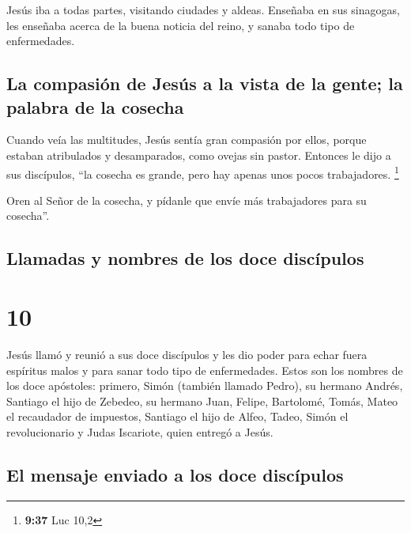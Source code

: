  Jesús iba a todas partes, visitando ciudades y aldeas.
Enseñaba en sus sinagogas, les enseñaba acerca de la buena noticia del
reino, y sanaba todo tipo de enfermedades.

\hypertarget{la-compasiuxf3n-de-jesuxfas-a-la-vista-de-la-gente-la-palabra-de-la-cosecha}{%
\subsection{La compasión de Jesús a la vista de la gente; la palabra de
la
cosecha}\label{la-compasiuxf3n-de-jesuxfas-a-la-vista-de-la-gente-la-palabra-de-la-cosecha}}

 Cuando veía las multitudes, Jesús sentía gran compasión
por ellos, porque estaban atribulados y desamparados, como ovejas sin
pastor.  Entonces le dijo a sus discípulos, ``la cosecha
es grande, pero hay apenas unos pocos trabajadores. \footnote{\textbf{9:37}
  Luc 10,2}

 Oren al Señor de la cosecha, y pídanle que envíe más
trabajadores para su cosecha''.

\hypertarget{llamadas-y-nombres-de-los-doce-discuxedpulos}{%
\subsection{Llamadas y nombres de los doce
discípulos}\label{llamadas-y-nombres-de-los-doce-discuxedpulos}}

\hypertarget{section-9}{%
\section{10}\label{section-9}}

 Jesús llamó y reunió a sus doce discípulos y les dio
poder para echar fuera espíritus malos y para sanar todo tipo de
enfermedades.  Estos son los nombres de los doce
apóstoles: primero, Simón (también llamado Pedro), su hermano Andrés,
Santiago el hijo de Zebedeo, su hermano Juan,  Felipe,
Bartolomé, Tomás, Mateo el recaudador de impuestos, Santiago el hijo de
Alfeo, Tadeo,  Simón el revolucionario y Judas Iscariote,
quien entregó a Jesús.

\hypertarget{el-mensaje-enviado-a-los-doce-discuxedpulos}{%
\subsection{El mensaje enviado a los doce
discípulos}\label{el-mensaje-enviado-a-los-doce-discuxedpulos}}

